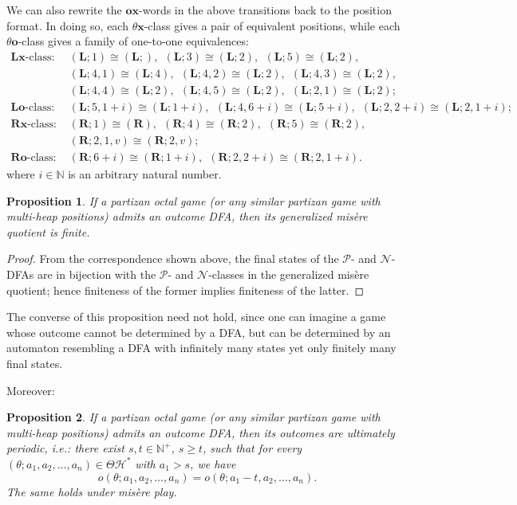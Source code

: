 \documentclass[11pt]{article}
\newtheorem{proposition}{Proposition}[section]
\theoremstyle{definition}
\theoremstyle{plain}
\newcommand{\varP}{\mathcal{P}}
\newcommand{\varN}{\mathcal{N}}
\newcommand{\rmL}{\mathbf{L}}
\newcommand{\rmR}{\mathbf{R}}
\newcommand{\x}{\mathbf{x}}
\newcommand{\e}{\mathbf{o}}
\newcommand{\varH}{\mathcal{H}}
\begin{document}
We can also rewrite the $\e\x$-words in the above transitions back to the position format.
In doing so, each $\theta\x$-class gives a pair of equivalent positions, while each $\theta\e$-class gives a family of one-to-one equivalences:
\small
\begin{align*}
    \text{$\rmL\x$-class:~~} & (\rmL; 1)\cong(\rmL;),~~  (\rmL; 3)\cong (\rmL; 2),~~ (\rmL; 5)\cong (\rmL; 2),~~ \\
         & (\rmL; 4, 1)\cong (\rmL; 4),~~ (\rmL; 4, 2)\cong (\rmL; 2),~~ (\rmL; 4, 3)\cong (\rmL; 2), \\
         & (\rmL; 4, 4)\cong (\rmL; 2),~~ (\rmL; 4, 5)\cong (\rmL; 2),~~ (\rmL; 2, 1)\cong (\rmL; 2); \\
    \text{$\rmL\e$-class:~~} & (\rmL; 5, 1\!+\!i)\cong (\rmL; 1\!+\!i),~~ (\rmL; 4, 6\!+\!i)\cong(\rmL; 5\!+\!i),~~ (\rmL; 2, 2\!+\!i)\cong (\rmL; 2,1\!+\!i); \\
    \text{$\rmR\x$-class:~~} & (\rmR; 1)\cong(\rmR),~~ (\rmR; 4)\cong (\rmR; 2),~~ (\rmR; 5)\cong (\rmR; 2), \\
         & (\rmR;2,1,v) \cong (\rmR; 2,v); \\
    \text{$\rmR\e$-class:~~} & (\rmR;6\!+\!i)\cong(\rmR;1\!+\!i),~~ (\rmR;2,2\!+\!i)\cong(\rmR;2,1\!+\!i).
\end{align*}\normalsize
where $i\in\mathbb{N}$ is an arbitrary natural number.

\begin{proposition}\label{finite_misquot}
    If a partizan octal game (or any similar partizan game with multi-heap positions) admits an outcome DFA, then its generalized misère quotient is finite.
\end{proposition}

\begin{proof}
    From the correspondence shown above, the final states of the $\varP$- and $\varN$-DFAs are in bijection with the $\varP$- and $\varN$-classes in the generalized misère quotient; hence finiteness of the former implies finiteness of the latter.
\end{proof}

The converse of this proposition need not hold, since one can imagine a game whose outcome cannot be determined by a DFA, but can be determined by an automaton resembling a DFA with infinitely many states yet only finitely many final states.

Moreover:

\begin{proposition}\label{normal_per}
    If a partizan octal game (or any similar partizan game with multi-heap positions) admits an outcome DFA, then its outcomes are \textit{ultimately periodic}, i.e.:
    there exist $s, t\in\mathbb{N}^+$, $s\geq t$,
    such that for every $(\theta; a_1, a_2,\ldots, a_n)\in\varTheta\varH^*$ with $a_1 > s$, we have
    \[
        o(\theta; a_1, a_2, \ldots, a_n)=o(\theta; a_1-t, a_2, \ldots, a_n).
    \]
    The same holds under misère play.
\end{proposition}
\end{document}
